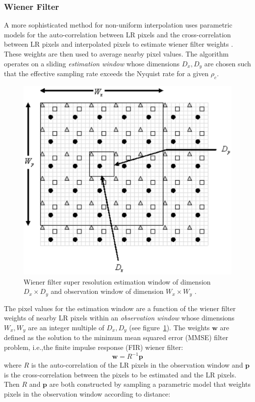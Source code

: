 \subsubsection{Wiener Filter}
A more sophisticated method for non-uniform interpolation uses parametric models for the auto-correlation between LR pixels and the cross-correlation between LR pixels and interpolated pixels to estimate wiener filter weights \cite{wiener}.
%
These weights are then used to average nearby pixel values.
%
The algorithm operates on a sliding \textit{estimation window} whose dimensions \(D_x, D_y\) are chosen such that the effective sampling rate exceeds the Nyquist rate for a given \(\rho_c\).
\begin{figure}[!htbp]
    \centering
    \includegraphics[width=.7\linewidth]{figures/classical/wiener.png}
    \caption{Wiener filter super resolution estimation window of dimension \(D_x \times D_y\) and observation window of dimension \(W_x \times W_y\) \cite{wiener}.}
    \label{fig:wiener}
\end{figure}
The pixel values for the estimation window are a function of the wiener filter weights of nearby LR pixels within an \textit{observation window} whose dimensions \(W_x, W_y\) are an integer multiple of \(D_x, D_y\) (see figure~\ref{fig:wiener}).
%
The weights \(\bm{w}\) are defined as the solution to the minimum mean squared error (MMSE) filter problem, i.e.,the finite impulse response (FIR) wiener filter:
\begin{equation}
    \bm{w} = R^{-1}\bm{p}
\end{equation}
where \(R\) is the auto-correlation of the LR pixels in the observation window and \(\bm{p}\) is the cross-correlation between the pixels to be estimated and the LR pixels.
%
Then \(R\) and \(\bm{p}\) are both constructed by sampling a parametric model that weights pixels in the observation window according to distance:
